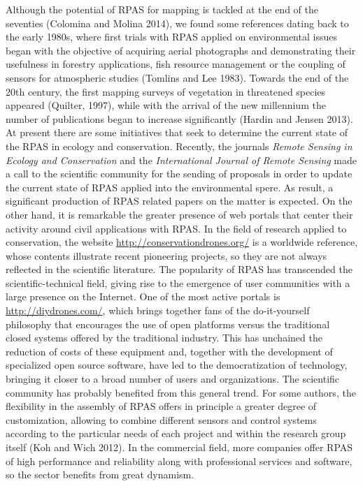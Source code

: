 \documentclass[]{interact}
\theoremstyle{plain}%
\theoremstyle{definition}
\theoremstyle{remark}
\begin{document}
Although the potential of RPAS for mapping is tackled at the end of the
seventies (Colomina and Molina 2014), we found some references dating
back to the early 1980s, where first trials with RPAS applied on
environmental issues began with the objective of acquiring aerial
photographs and demonstrating their usefulness in forestry applications,
fish resource management or the coupling of sensors for atmospheric
studies (Tomlins and Lee 1983). Towards the end of the 20th century, the
first mapping surveys of vegetation in threatened species appeared
(Quilter, 1997), while with the arrival of the new millennium the number
of publications began to increase significantly (Hardin and Jensen
2013). At present there are some initiatives that seek to determine the
current state of the RPAS in ecology and conservation. Recently, the
journals \emph{Remote Sensing in Ecology and Conservation} and the
\emph{International Journal of Remote Sensing} made a call to the
scientific community for the sending of proposals in order to update the
current state of RPAS applied into the environmental spere. As result, a
significant production of RPAS related papers on the matter is expected.
On the other hand, it is remarkable the greater presence of web portals
that center their activity around civil applications with RPAS. In the
field of research applied to conservation, the website
\url{http://conservationdrones.org/} is a worldwide reference, whose
contents illustrate recent pioneering projects, so they are not always
reflected in the scientific literature. The popularity of RPAS has
transcended the scientific-technical field, giving rise to the emergence
of user communities with a large presence on the Internet. One of the
most active portals is \url{http://diydrones.com/}, which brings
together fans of the do-it-yourself philosophy that encourages the use
of open platforms versus the traditional closed systems offered by the
traditional industry. This has unchained the reduction of costs of these
equipment and, together with the development of specialized open source
software, have led to the democratization of technology, bringing it
closer to a broad number of users and organizations. The scientific
community has probably benefited from this general trend. For some
authors, the flexibility in the assembly of RPAS offers in principle a
greater degree of customization, allowing to combine different sensors
and control systems according to the particular needs of each project
and within the research group itself (Koh and Wich 2012). In the
commercial field, more companies offer RPAS of high performance and
reliability along with professional services and software, so the sector
benefits from great dynamism.
\end{document}
